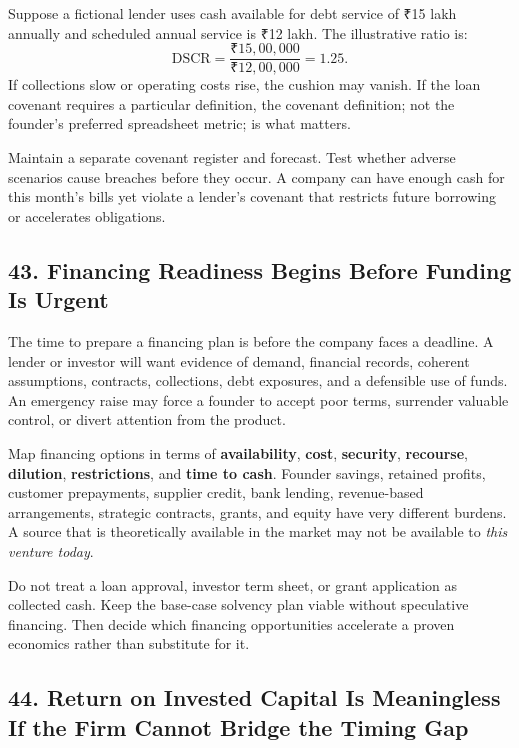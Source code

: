 Suppose a fictional lender uses cash available for debt service of ₹15 lakh annually and scheduled annual service is ₹12 lakh. The illustrative ratio is:
\begin{equation}
\text{DSCR} = \frac{₹15,00,000}{₹12,00,000} = \mathbf{1.25}.
\end{equation}
If collections slow or operating costs rise, the cushion may vanish. If the loan covenant requires a particular definition, the covenant definition; not the founder's preferred spreadsheet metric; is what matters.

Maintain a separate covenant register and forecast. Test whether adverse scenarios cause breaches before they occur. A company can have enough cash for this month's bills yet violate a lender's covenant that restricts future borrowing or accelerates obligations.

\subsection*{43. Financing Readiness Begins Before Funding Is Urgent}

The time to prepare a financing plan is before the company faces a deadline. A lender or investor will want evidence of demand, financial records, coherent assumptions, contracts, collections, debt exposures, and a defensible use of funds. An emergency raise may force a founder to accept poor terms, surrender valuable control, or divert attention from the product.

Map financing options in terms of \textbf{availability}, \textbf{cost}, \textbf{security}, \textbf{recourse}, \textbf{dilution}, \textbf{restrictions}, and \textbf{time to cash}. Founder savings, retained profits, customer prepayments, supplier credit, bank lending, revenue-based arrangements, strategic contracts, grants, and equity have very different burdens. A source that is theoretically available in the market may not be available to \emph{this venture today}.

Do not treat a loan approval, investor term sheet, or grant application as collected cash. Keep the base-case solvency plan viable without speculative financing. Then decide which financing opportunities accelerate a proven economics rather than substitute for it.

\subsection*{44. Return on Invested Capital Is Meaningless If the Firm Cannot Bridge the Timing Gap}


